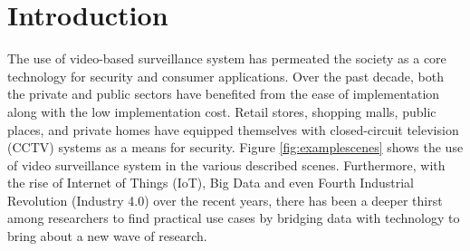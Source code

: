 \chapter{Introduction}
The use of video-based surveillance system has permeated the society as a core technology for security and consumer applications. Over the past decade, both the private and public sectors have benefited from the ease of implementation along with the low implementation cost.
Retail stores, shopping malls, public places, and private homes have equipped themselves with closed-circuit television (CCTV) systems as a means for security. Figure \ref{fig:examplescenes} shows the use of video surveillance system in the various described scenes.
Furthermore, with the rise of Internet of Things (IoT), Big Data and even
Fourth Industrial Revolution (Industry 4.0)
over the recent years, there has been a deeper thirst among researchers to find practical use cases by bridging %
data with technology to bring about a new wave of research.

